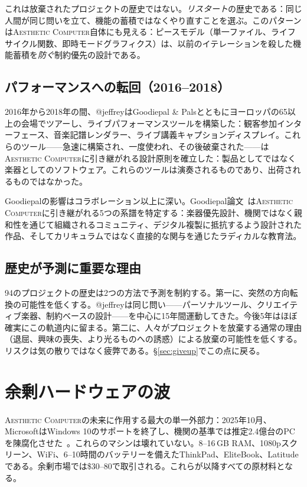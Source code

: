 \documentclass[10pt,letterpaper,twocolumn]{article}
\newcommand{\ac}{\textsc{Aesthetic Computer}}
\begin{document}
これは放棄されたプロジェクトの歴史ではない。\emph{リスタート}の歴史である：同じ人間が同じ問いを立て、機能の蓄積ではなくやり直すことを選ぶ。このパターンは\ac{}自体にも見える：ピースモデル（単一ファイル、ライフサイクル関数、即時モードグラフィクス）は、以前のイテレーションを殺した機能蓄積を\emph{防ぐ}制約優先の設計である。

\subsection{パフォーマンスへの転回（2016--2018）}

2016年から2018年の間、@jeffreyはGoodiepal \& Palsとともにヨーロッパの65以上の会場でツアーし、ライブパフォーマンスツールを構築した：観客参加インターフェース、音楽記譜レンダラー、ライブ講義キャプションディスプレイ。これらのツール——急速に構築され、一度使われ、その後破棄された——は\ac{}に引き継がれる設計原則を確立した：製品としてではなく楽器としてのソフトウェア。これらのツールは演奏されるものであり、出荷されるものではなかった。

Goodiepalの影響はコラボレーション以上に深い。Goodiepal論文~\citep{scudder2026goodiepal}は\ac{}に引き継がれる5つの系譜を特定する：楽器優先設計、機関ではなく親和性を通じて組織されるコミュニティ、デジタル複製に抵抗するよう設計された作品、そしてカリキュラムではなく直接的な関与を通じたラディカルな教育法。

\subsection{歴史が予測に重要な理由}

94のプロジェクトの歴史は2つの方法で予測を制約する。第一に、突然の方向転換の可能性を低くする。@jeffreyは同じ問い——パーソナルツール、クリエイティブ楽器、制約ベースの設計——を中心に15年間運動してきた。今後5年はほぼ確実にこの軌道内に留まる。第二に、人々がプロジェクトを放棄する通常の理由（退屈、興味の喪失、より光るものへの誘惑）による放棄の可能性を低くする。リスクは気の散りではなく疲弊である。\S\ref{sec:giveup}でこの点に戻る。


\section{余剰ハードウェアの波}
\label{sec:surplus}

\ac{}の未来に作用する最大の単一外部力：2025年10月、MicrosoftはWindows 10のサポートを終了し、機関の基準では推定2.4億台のPCを陳腐化させた~\citep{ewaste2024monitor}。これらのマシンは壊れていない。8--16\,GB RAM、1080pスクリーン、WiFi、6--10時間のバッテリーを備えたThinkPad、EliteBook、Latitudeである。余剰市場では\$30--80で取引される。これらが以降すべての原材料となる。
\end{document}
